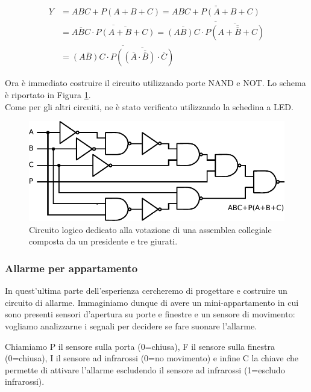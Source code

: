 \vspace{-1mm}
\begin{minipage}{0.6\textwidth}
\begin{align}
Y 	&= ABC+P(A+B+C)
	= \overline{\overline{ABC+P(A+B+C)}} \nonumber \\
	&= \overline{\overline{ABC} \cdot \overline {P(A+B+C)} }
	= \overline{\overline{(AB)C} \cdot \overline {P(\overline{\overline{{A+B+C}} })}} \nonumber \\
	&= \overline{\overline{(AB)C} \cdot \overline {P(\overline{{(\overline A \cdot \overline B) \cdot \overline C} })}} \nonumber
\end{align}
\end{minipage}
\vspace{3mm}

Ora è immediato costruire il circuito utilizzando porte NAND e NOT.
Lo schema è riportato in Figura \ref{cir9:giudici}.\\
Come per gli altri circuiti, ne è stato verificato utilizzando la schedina a LED. 

\begin{figure}[htpc]
\centering
\includegraphics[width=.75\textwidth]{../E09/latex/giudici.pdf}
\caption{Circuito logico dedicato alla votazione di una assemblea collegiale composta da un presidente e tre giurati.}
\label{cir9:giudici}
\end{figure}

\subsubsection{Allarme per appartamento}

In quest'ultima parte dell'esperienza cercheremo di progettare e costruire un circuito di allarme. Immaginiamo dunque di avere un mini-appartamento in cui sono presenti sensori d'apertura su porte e finestre e un sensore di movimento: vogliamo analizzarne i segnali per decidere se fare suonare l'allarme.

Chiamiamo P il sensore sulla porta (0=chiusa), F il sensore sulla finestra (0=chiusa), I il sensore ad infrarossi (0=no movimento) e infine C la chiave che permette di attivare l'allarme escludendo il sensore ad infrarossi (1=escludo infrarossi).

